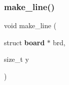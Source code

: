 \mbox{\label{tools_8c_a97d0b3536ca1b715182ae405fd4fe643}} 
\subsubsection{make\+\_\+line()}
{\footnotesize\ttfamily void make\+\_\+line (\begin{DoxyParamCaption}\item[{struct \textbf{ board} $\ast$}]{brd,  }\item[{size\+\_\+t}]{y }\end{DoxyParamCaption})\hspace{0.3cm}{\ttfamily [inline]}}


